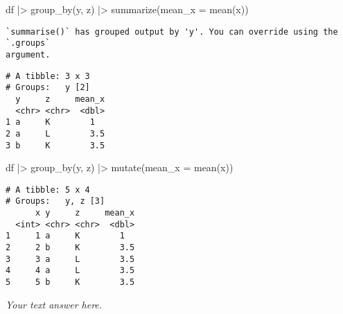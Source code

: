 \documentclass[
  letterpaper,
  DIV=11,
  numbers=noendperiod]{scrreprt}
\newenvironment{Shaded}{\begin{snugshade}}{\end{snugshade}}
\newcommand{\AttributeTok}[1]{\textcolor[rgb]{0.40,0.45,0.13}{#1}}
\newcommand{\FunctionTok}[1]{\textcolor[rgb]{0.28,0.35,0.67}{#1}}
\newcommand{\NormalTok}[1]{\textcolor[rgb]{0.00,0.23,0.31}{#1}}
\newcommand{\SpecialCharTok}[1]{\textcolor[rgb]{0.37,0.37,0.37}{#1}}
\begin{document}
\begin{enumerate}
  \begin{tcolorbox}[enhanced jigsaw, breakable, bottomtitle=1mm, left=2mm, colback=white, toprule=.15mm, leftrule=.75mm, colframe=quarto-callout-note-color-frame, colbacktitle=quarto-callout-note-color!10!white, title={Answer}, coltitle=black, toptitle=1mm, bottomrule=.15mm, opacitybacktitle=0.6, arc=.35mm, rightrule=.15mm, titlerule=0mm, opacityback=0]

\begin{Shaded}
\begin{Highlighting}[]
\NormalTok{df }\SpecialCharTok{|\textgreater{}}
  \FunctionTok{group\_by}\NormalTok{(y, z) }\SpecialCharTok{|\textgreater{}}
  \FunctionTok{summarize}\NormalTok{(}\AttributeTok{mean\_x =} \FunctionTok{mean}\NormalTok{(x))}
\end{Highlighting}
\end{Shaded}

\begin{verbatim}
`summarise()` has grouped output by 'y'. You can override using the `.groups`
argument.
\end{verbatim}

\begin{verbatim}
# A tibble: 3 x 3
# Groups:   y [2]
  y     z     mean_x
  <chr> <chr>  <dbl>
1 a     K        1  
2 a     L        3.5
3 b     K        3.5
\end{verbatim}

\begin{Shaded}
\begin{Highlighting}[]
\NormalTok{df }\SpecialCharTok{|\textgreater{}}
  \FunctionTok{group\_by}\NormalTok{(y, z) }\SpecialCharTok{|\textgreater{}}
  \FunctionTok{mutate}\NormalTok{(}\AttributeTok{mean\_x =} \FunctionTok{mean}\NormalTok{(x))}
\end{Highlighting}
\end{Shaded}

\begin{verbatim}
# A tibble: 5 x 4
# Groups:   y, z [3]
      x y     z     mean_x
  <int> <chr> <chr>  <dbl>
1     1 a     K        1  
2     2 b     K        3.5
3     3 a     L        3.5
4     4 a     L        3.5
5     5 b     K        3.5
\end{verbatim}

  \emph{Your text answer here.}

  \end{tcolorbox}
\end{enumerate}

\end{document}
